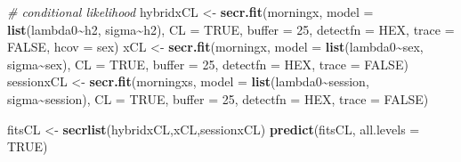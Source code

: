 \documentclass[
]{book}
\newenvironment{Shaded}{\begin{snugshade}}{\end{snugshade}}
\newcommand{\AttributeTok}[1]{\textcolor[rgb]{0.13,0.29,0.53}{#1}}
\newcommand{\CommentTok}[1]{\textcolor[rgb]{0.56,0.35,0.01}{\textit{#1}}}
\newcommand{\ConstantTok}[1]{\textcolor[rgb]{0.56,0.35,0.01}{#1}}
\newcommand{\DecValTok}[1]{\textcolor[rgb]{0.00,0.00,0.81}{#1}}
\newcommand{\FunctionTok}[1]{\textcolor[rgb]{0.13,0.29,0.53}{\textbf{#1}}}
\newcommand{\NormalTok}[1]{#1}
\newcommand{\OtherTok}[1]{\textcolor[rgb]{0.56,0.35,0.01}{#1}}
\newcommand{\SpecialCharTok}[1]{\textcolor[rgb]{0.81,0.36,0.00}{\textbf{#1}}}
\newcommand{\StringTok}[1]{\textcolor[rgb]{0.31,0.60,0.02}{#1}}
\begin{document}
\begin{Shaded}
\begin{Highlighting}[]
\CommentTok{\# conditional likelihood}
\NormalTok{hybridxCL  }\OtherTok{\textless{}{-}} \FunctionTok{secr.fit}\NormalTok{(morningx, }\AttributeTok{model =} \FunctionTok{list}\NormalTok{(lambda0}\SpecialCharTok{\textasciitilde{}}\NormalTok{h2, sigma}\SpecialCharTok{\textasciitilde{}}\NormalTok{h2),}
             \AttributeTok{CL =} \ConstantTok{TRUE}\NormalTok{, }\AttributeTok{buffer =} \DecValTok{25}\NormalTok{, }\AttributeTok{detectfn =} \StringTok{\textquotesingle{}HEX\textquotesingle{}}\NormalTok{, }\AttributeTok{trace =} \ConstantTok{FALSE}\NormalTok{,  }\AttributeTok{hcov =} \StringTok{\textquotesingle{}sex\textquotesingle{}}\NormalTok{)}
\NormalTok{xCL        }\OtherTok{\textless{}{-}} \FunctionTok{secr.fit}\NormalTok{(morningx, }\AttributeTok{model =} \FunctionTok{list}\NormalTok{(lambda0}\SpecialCharTok{\textasciitilde{}}\NormalTok{sex, sigma}\SpecialCharTok{\textasciitilde{}}\NormalTok{sex), }
             \AttributeTok{CL =} \ConstantTok{TRUE}\NormalTok{, }\AttributeTok{buffer =} \DecValTok{25}\NormalTok{, }\AttributeTok{detectfn =} \StringTok{\textquotesingle{}HEX\textquotesingle{}}\NormalTok{, }\AttributeTok{trace =} \ConstantTok{FALSE}\NormalTok{)}
\NormalTok{sessionxCL }\OtherTok{\textless{}{-}} \FunctionTok{secr.fit}\NormalTok{(morningxs, }\AttributeTok{model =} \FunctionTok{list}\NormalTok{(lambda0}\SpecialCharTok{\textasciitilde{}}\NormalTok{session, sigma}\SpecialCharTok{\textasciitilde{}}\NormalTok{session), }
             \AttributeTok{CL =} \ConstantTok{TRUE}\NormalTok{, }\AttributeTok{buffer =} \DecValTok{25}\NormalTok{, }\AttributeTok{detectfn =} \StringTok{\textquotesingle{}HEX\textquotesingle{}}\NormalTok{, }\AttributeTok{trace =} \ConstantTok{FALSE}\NormalTok{)}
\end{Highlighting}
\end{Shaded}

\begin{Shaded}
\begin{Highlighting}[]
\NormalTok{fitsCL }\OtherTok{\textless{}{-}} \FunctionTok{secrlist}\NormalTok{(hybridxCL,xCL,sessionxCL)}
\FunctionTok{predict}\NormalTok{(fitsCL, }\AttributeTok{all.levels =} \ConstantTok{TRUE}\NormalTok{)}
\end{Highlighting}
\end{Shaded}
\end{document}

